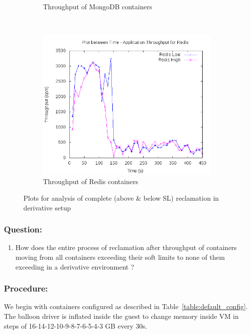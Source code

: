 \begin{figure}[t!]
\begin{subfigure}[t]{0.48\textwidth}
	    \caption{Throughput of MongoDB containers}
	    \label{plot_inference_complete_mongo}
	  \end{subfigure}
	  ~ 
	  \begin{subfigure}[t]{0.48\textwidth}
	    \centering
	    \includegraphics[width=1\textwidth]{images/controller_issues/derivative/complete_redis.png}
	    \caption{Throughput of Redis containers}
	    \label{plot_inference_complete_redis}
	  \end{subfigure}
	  \caption{Plots for analysis of complete (above \& below SL) reclamation in derivative setup}
	\end{figure}
	
	\subsubsection{Question:}
	  \begin{enumerate}	    
	    \item How does the entire process of reclamation after throughput of containers moving from all containers exceeding 
	    their soft limits to none of them exceeding in a derivative environment ?
	  \end{enumerate}	
	
	\subsubsection{Procedure:}
	  We begin with containers configured as described in Table~\ref{table:default_config}. The balloon driver is inflated inside the 
guest to change memory inside VM in steps of 16-14-12-10-9-8-7-6-5-4-3 GB every 30s. 
	
